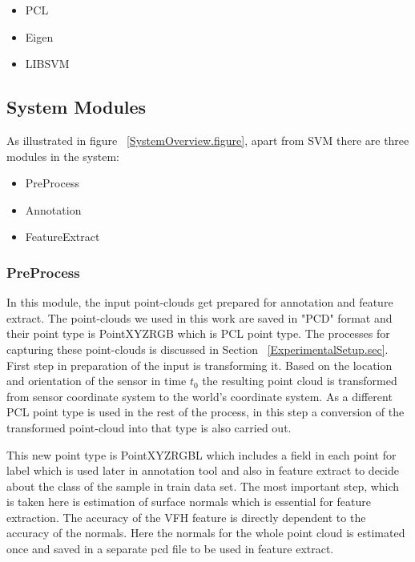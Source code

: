 \begin{itemize}
 \item PCL \cite{Rusu_ICRA2011_PCL}
 \item Eigen \cite{eigenweb}
 \item LIBSVM \cite{LIBSVM}
\end{itemize}


\subsection{System Modules}
As illustrated in figure ~\ref{SystemOverview.figure}, apart from SVM there are three modules in the system:

\begin{itemize}
  \item PreProcess
  \item Annotation
  \item FeatureExtract
\end{itemize}

\subsubsection{PreProcess}
\label{PreProcess.ssec}
 In this module, the input point-clouds get prepared for annotation and feature extract. 
 The point-clouds we used in this work are saved in "PCD" format and their point type is PointXYZRGB which is PCL point type. 
 The processes for capturing these point-clouds is discussed in Section ~\ref{ExperimentalSetup.sec}. 
 First step in preparation of the input is transforming it.
 Based on the location and orientation of the sensor in time $t_0$ the resulting point cloud is transformed from sensor coordinate 
 system to the world's coordinate system. 
 As a different PCL point type is used in the rest of the process, in this step a conversion of the transformed point-cloud into that type 
 is also carried out.
 
 This new point type is PointXYZRGBL which includes a field in each point for label which is used later in annotation 
 tool and also in feature extract to decide about the class of the sample in train data set. 
 The most important step, which is taken here is estimation of surface normals which is essential for feature extraction. 
 The accuracy of the VFH feature is directly dependent to the accuracy of the normals. 
 Here the normals for the whole point cloud is estimated once and saved in a separate pcd file to be used in feature extract. 
 
